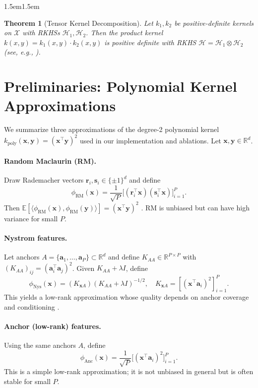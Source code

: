 \documentclass{article}
\newtheorem{theorem}{Theorem}
\begin{document}
\begin{adjustwidth}{1.5em}{1.5em}
\begin{theorem}[Tensor Kernel Decomposition]
\label{thm:tensor-rkhs}
Let $k_1, k_2$ be positive-definite kernels on $\mathcal{X}$
with RKHSs $\mathcal{H}_1, \mathcal{H}_2$.
Then the product kernel
$k(x,y) = k_1(x,y) \cdot k_2(x,y)$
is positive definite with RKHS
$\mathcal{H} = \mathcal{H}_1 \otimes \mathcal{H}_2$
(see, e.g., \citep{aronszajn1950,berlinet2004}).
\end{theorem}
\end{adjustwidth}

\section{Preliminaries: Polynomial Kernel Approximations}
\label{app:prelim-poly}

We summarize three approximations of the degree-2 polynomial kernel
$k_{\text{poly}}(\mathbf{x},\mathbf{y})=(\mathbf{x}^\top \mathbf{y})^2$
used in our implementation and ablations.
Let $\mathbf{x},\mathbf{y}\in\mathbb{R}^d$.

\paragraph{Random Maclaurin (RM).}
Draw Rademacher vectors
$\mathbf{r}_i, \mathbf{s}_i\in\{\pm1\}^d$ and define
\[
\phi_{\text{RM}}(\mathbf{x})
=
\frac{1}{\sqrt{P}}
\bigl[(\mathbf{r}_i^\top \mathbf{x})(\mathbf{s}_i^\top \mathbf{x})\bigr]_{i=1}^P.
\]
Then
$\mathbb{E}[\langle \phi_{\text{RM}}(\mathbf{x}),
\phi_{\text{RM}}(\mathbf{y})\rangle]
=
(\mathbf{x}^\top \mathbf{y})^2$
\citep{karkarnick2012}.
RM is unbiased but can have high variance for small $P$.

\paragraph{Nystrom features.}
Let anchors
$A=\{\mathbf{a}_1,\dots,\mathbf{a}_P\}\subset\mathbb{R}^d$ and define
$K_{AA}\in\mathbb{R}^{P\times P}$ with
$(K_{AA})_{ij}=(\mathbf{a}_i^\top \mathbf{a}_j)^2$.
Given $K_{AA}+\lambda I$, define
\[
\phi_{\text{Nys}}(\mathbf{x})
=
(K_{\mathbf{x}A})(K_{AA}+\lambda I)^{-1/2},
\quad
K_{\mathbf{x}A}
=
[(\mathbf{x}^\top \mathbf{a}_i)^2]_{i=1}^P.
\]
This yields a low-rank approximation whose quality depends on anchor
coverage and conditioning \citep{williams2001nystrom}.

\paragraph{Anchor (low-rank) features.}
Using the same anchors $A$, define
\[
\phi_{\text{Anc}}(\mathbf{x})
=
\frac{1}{\sqrt{P}}
\bigl[(\mathbf{x}^\top \mathbf{a}_i)^2\bigr]_{i=1}^P.
\]
This is a simple low-rank approximation; it is not unbiased in general
but is often stable for small $P$.
\end{document}
